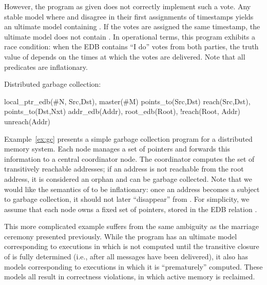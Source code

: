 However, the \lang program as given does not correctly implement such a vote.
Any stable model where  and 
disagree in their first assignments of timestamps yields an ultimate model
containing .  If the votes are assigned the same timestamp,
the ultimate model does not contain . In operational terms,
this program exhibits a race condition: when the EDB contains ``I do'' votes
from both parties, the truth value of  depends on the times
at which the votes are delivered. Note that all predicates are inflationary.

\begin{example}
\label{ex:gc}
Distributed garbage collection:

\begin{Drules}
        {local_ptr_edb(#N, Src,Dst), master(#M)}
        {points_to(Src,Dst)}
        {reach(Src,Dst), points_to(Dst,Nxt)}
        {addr_edb(Addr), root_edb(Root), !reach(Root, Addr)}
   {unreach(Addr)}
\end{Drules}
\end{example}
Example~\ref{ex:gc} presents a simple garbage collection program for a
distributed memory system. Each node manages a set of pointers and forwards this
information to a central coordinator node. The coordinator computes the set of
transitively reachable addresses; if an address is not reachable from the root
address, it is considered an orphan and can be garbage collected. Note that we
would like the semantics of  to be inflationary: once an
address becomes a subject to garbage collection, it should not later
``disappear'' from . For simplicity, we assume that each node
owns a fixed set of pointers, stored in the EDB relation
.

This more complicated example suffers from the same ambiguity as the marriage
ceremony presented previously.  While the program has an ultimate model
corresponding to executions in which  is not computed until the
transitive closure of  is fully determined (i.e.,
after all messages have been delivered), it also has models corresponding to
executions in which it is ``prematurely'' computed.  These models all result in
correctness violations, in which active memory is reclaimed.

